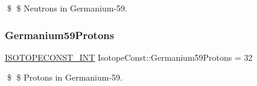 \$ \$ Neutrons in Germanium-\/59. \mbox{\label{group___isotope_const-_germanium-_ge59_gac7d62c281e03c488c5029baa6f666385}} 
\subsubsection{\texorpdfstring{Germanium59\+Protons}{Germanium59Protons}}
{\footnotesize\ttfamily \mbox{\hyperlink{group___isotope_const-_macros_ga5f18360b3e99483a35c32d789e62621c}{I\+S\+O\+T\+O\+P\+E\+C\+O\+N\+S\+T\+\_\+\+I\+NT}} Isotope\+Const\+::\+Germanium59\+Protons = 32}

\$ \$ Protons in Germanium-\/59. 